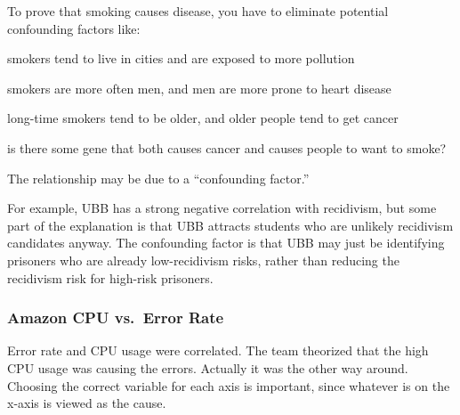 \documentclass[landscape]{exam}
\begin{document}
  To prove that smoking causes disease, you have to eliminate potential
  confounding factors like:
  \begin{itemize*}
    \item smokers tend to live in cities and are exposed to more pollution
    \item smokers are more often men, and men are more prone to heart disease
    \item long-time smokers tend to be older, and older people tend to get
      cancer
    \item is there some gene that both causes cancer and causes people to
      want to smoke?
  \end{itemize*}

  The relationship may be due to a ``confounding factor.''  
  
  For example, UBB has a strong negative correlation with recidivism, but some
  part of the explanation is that UBB attracts students who are unlikely
  recidivism candidates anyway.   The confounding factor is that UBB may just be
  identifying prisoners who are already low-recidivism risks, rather than
  reducing the recidivism risk for high-risk prisoners.

  \subsubsection{Amazon CPU vs.\ Error Rate} %

  Error rate and CPU usage were correlated. The team theorized that the high
  CPU usage was causing the errors. Actually it was the other way around.
  Choosing the correct variable for each axis is important, since whatever is on
  the x-axis is viewed as the cause.
  

  
\end{document}
